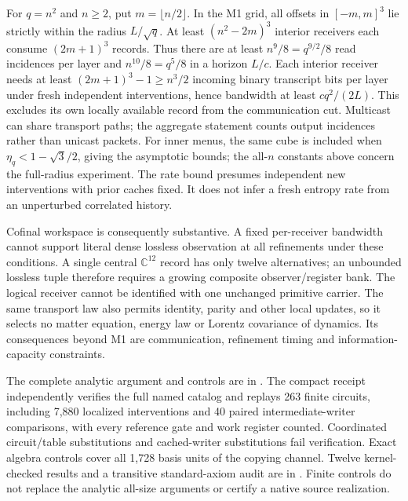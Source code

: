 For $q=n^2$ and $n\geq2$, put $m=\lfloor n/2\rfloor$. In the M1 grid,
all offsets in $[-m,m]^3$ lie strictly within the radius $L/\sqrt q$.
At least $(n^2-2m)^3$ interior receivers each consume $(2m+1)^3$ records.
Thus there are at least $n^9/8=q^{9/2}/8$ read incidences per layer and
$n^{10}/8=q^5/8$ in a horizon $L/c$. Each interior receiver needs at least
$(2m+1)^3-1\geq n^3/2$ incoming binary transcript bits per layer under fresh
independent interventions, hence bandwidth at least $cq^2/(2L)$. This excludes
its own locally available record from the communication cut.
Multicast can share transport paths;
the aggregate statement counts output incidences rather than unicast packets.
For inner menus, the same cube is included when
$\eta_q<1-\sqrt3/2$, giving the asymptotic bounds; the all-$n$ constants
above concern the full-radius experiment.
The rate bound presumes independent new interventions with prior caches fixed.
It does not infer a fresh entropy rate from an unperturbed correlated history.

Cofinal workspace is consequently substantive. A fixed per-receiver bandwidth
cannot support literal dense lossless observation at all refinements under
these conditions. A single central $\mathbb C^{12}$ record has only twelve
alternatives; an unbounded lossless tuple therefore requires a growing
composite observer/register bank. The logical receiver cannot be identified
with one unchanged primitive carrier. The same transport law also permits identity, parity and
other local updates, so it selects no matter equation, energy law or Lorentz
covariance of dynamics. Its consequences beyond M1 are communication,
refinement timing and information-capacity constraints.

The complete analytic argument and controls are in
.
The compact receipt independently verifies the full named catalog and replays
263 finite circuits, including 7,880 localized interventions and 40 paired
intermediate-writer comparisons, with every reference gate and work register
counted. Coordinated circuit/table substitutions and cached-writer substitutions
fail verification. Exact algebra controls cover all 1,728 basis units of the copying
channel. Twelve kernel-checked results and a transitive standard-axiom audit
are in .
Finite controls do not replace the analytic all-size arguments or certify a
native source realization.
